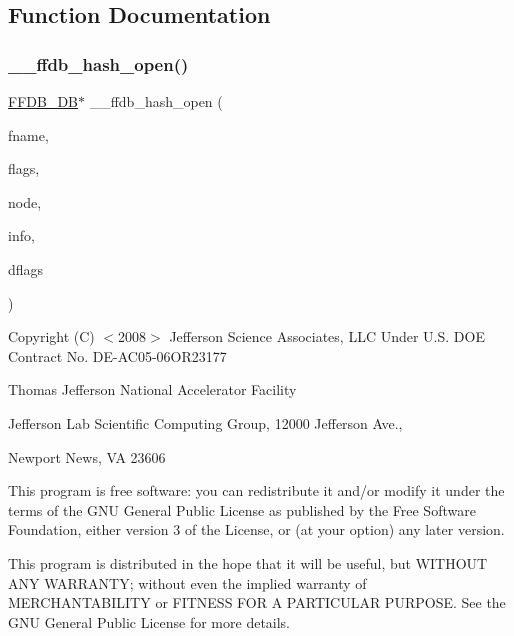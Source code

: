 \subsection{Function Documentation}
\mbox{\label{adat-devel_2other__libs_2filedb_2filehash_2ffdb__db_8c_a415affcc4f0854dfe569ac4c43a72e7f}} 
\subsubsection{\texorpdfstring{\_\_ffdb\_hash\_open()}{\_\_ffdb\_hash\_open()}}
{\footnotesize\ttfamily \mbox{\hyperlink{adat-devel_2other__libs_2filedb_2filehash_2ffdb__db_8h_a0b27b956926453a7a8141ea8e10f0df8}{F\+F\+D\+B\+\_\+\+DB}}$\ast$ \+\_\+\+\_\+ffdb\+\_\+hash\+\_\+open (\begin{DoxyParamCaption}\item[{const char $\ast$}]{fname,  }\item[{int}]{flags,  }\item[{int}]{node,  }\item[{const \mbox{\hyperlink{structFFDB__HASHINFO}{F\+F\+D\+B\+\_\+\+H\+A\+S\+H\+I\+N\+FO}} $\ast$}]{info,  }\item[{int}]{dflags }\end{DoxyParamCaption})}

Copyright (C) $<$2008$>$ Jefferson Science Associates, L\+LC Under U.\+S. D\+OE Contract No. D\+E-\/\+A\+C05-\/06\+O\+R23177

Thomas Jefferson National Accelerator Facility

Jefferson Lab Scientific Computing Group, 12000 Jefferson Ave.,

Newport News, VA 23606

This program is free software\+: you can redistribute it and/or modify it under the terms of the G\+NU General Public License as published by the Free Software Foundation, either version 3 of the License, or (at your option) any later version.

This program is distributed in the hope that it will be useful, but W\+I\+T\+H\+O\+UT A\+NY W\+A\+R\+R\+A\+N\+TY; without even the implied warranty of M\+E\+R\+C\+H\+A\+N\+T\+A\+B\+I\+L\+I\+TY or F\+I\+T\+N\+E\+SS F\+OR A P\+A\+R\+T\+I\+C\+U\+L\+AR P\+U\+R\+P\+O\+SE. See the G\+NU General Public License for more details.

